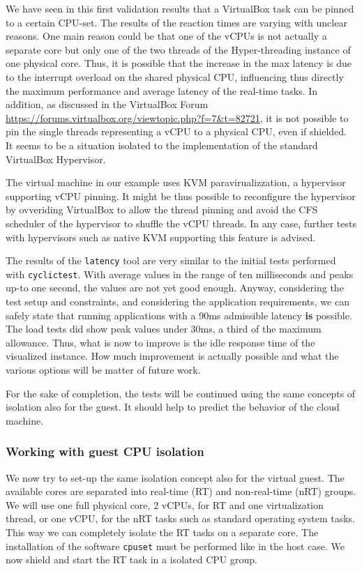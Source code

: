 \documentclass[]{scrartcl}
\begin{document}
We have seen in this first validation results that a VirtualBox task can be pinned to a certain CPU-set. The results of the reaction times are varying with unclear reasons. 
One main reason could be that one of the vCPUs is not actually a separate core but only one of the two threads of the Hyper-threading instance of one physical core. 
Thus, it is possible that the increase in the max latency is due to the interrupt overload on the shared physical CPU, influencing thus directly the maximum performance and average latency of the real-time tasks. In addition, as discussed in the VirtualBox Forum \url{https://forums.virtualbox.org/viewtopic.php?f=7&t=82721}, it is not possible to pin the single threads representing a vCPU to a physical CPU, even if shielded. It seems to be a situation isolated to the implementation of the standard VirtualBox Hypervisor. 

The virtual machine in our example uses KVM paravirualizzation, a hypervisor supporting vCPU pinning. It might be thus possible to reconfigure the hypervisor by ovveriding VirtualBox to allow the thread pinning and avoid the CFS scheduler of the hypervisor to shuffle the vCPU threads. In any case, further tests with hypervisors such as native KVM supporting this feature is advised.

The results of the \texttt{latency} tool are very similar to the initial tests performed with \texttt{cyclictest}. With average values in the range of ten milliseconds and peaks up-to one second, the values are not yet good enough. 
Anyway, considering the test setup and constraints, and considering the application requirements, we can safely state that running applications with a 90ms admissible latency \textbf{is} possible. The load tests did show peak values under 30ms, a third of the maximum allowance. 
Thus, what is now to improve is the idle response time of the visualized instance. How much improvement is actually possible and what the various options will be matter of future work.

For the sake of completion, the tests will be continued using the same concepts of isolation also for the guest. It should help to predict the behavior of the cloud machine.

\subsubsection{Working with guest CPU isolation}

We now try to set-up the same isolation concept also for the virtual guest. The available cores are separated into real-time (RT) and non-real-time (nRT) groups. We will use one full physical core, 2 vCPUs, for RT and one virtualization thread, or one vCPU, for the nRT tasks such as standard operating system tasks. This way we can completely isolate the RT tasks on a separate core. The installation of the software \texttt{cpuset} must be performed like in the host case. We now shield and start the RT task in a isolated CPU group.
\end{document}
